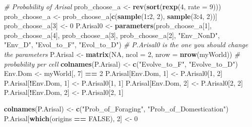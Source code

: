 \documentclass[]{book}
\newenvironment{Shaded}{\begin{snugshade}}{\end{snugshade}}
\newcommand{\KeywordTok}[1]{\textcolor[rgb]{0.13,0.29,0.53}{\textbf{{#1}}}}
\newcommand{\DataTypeTok}[1]{\textcolor[rgb]{0.13,0.29,0.53}{{#1}}}
\newcommand{\DecValTok}[1]{\textcolor[rgb]{0.00,0.00,0.81}{{#1}}}
\newcommand{\StringTok}[1]{\textcolor[rgb]{0.31,0.60,0.02}{{#1}}}
\newcommand{\CommentTok}[1]{\textcolor[rgb]{0.56,0.35,0.01}{\textit{{#1}}}}
\newcommand{\OtherTok}[1]{\textcolor[rgb]{0.56,0.35,0.01}{{#1}}}
\newcommand{\OperatorTok}[1]{\textcolor[rgb]{0.81,0.36,0.00}{\textbf{{#1}}}}
\newcommand{\NormalTok}[1]{{#1}}
\theoremstyle{definition}
\theoremstyle{definition}
\theoremstyle{definition}
\theoremstyle{remark}
\begin{document}
\begin{Shaded}
\begin{Highlighting}[]
    
    \CommentTok{# Probability of Arisal}
\NormalTok{    prob_choose_a <-}\StringTok{ }\KeywordTok{rev}\NormalTok{(}\KeywordTok{sort}\NormalTok{(}\KeywordTok{rexp}\NormalTok{(}\DecValTok{4}\NormalTok{, }\DataTypeTok{rate =} \DecValTok{9}\NormalTok{)))}
\NormalTok{    prob_choose_a <-}\StringTok{ }\NormalTok{prob_choose_a[}\KeywordTok{c}\NormalTok{(}\KeywordTok{sample}\NormalTok{(}\DecValTok{1}\OperatorTok{:}\DecValTok{2}\NormalTok{, }\DecValTok{2}\NormalTok{), }\KeywordTok{sample}\NormalTok{(}\DecValTok{3}\OperatorTok{:}\DecValTok{4}\NormalTok{, }\DecValTok{2}\NormalTok{))]}
\NormalTok{    prob_choose_a[}\DecValTok{3}\NormalTok{] <-}\StringTok{ }\DecValTok{0}
\NormalTok{    P.Arisal0  <-}\StringTok{ }\KeywordTok{parameters}\NormalTok{(prob_choose_a[}\DecValTok{1}\NormalTok{], prob_choose_a[}\DecValTok{4}\NormalTok{],}
\NormalTok{                             prob_choose_a[}\DecValTok{3}\NormalTok{], prob_choose_a[}\DecValTok{2}\NormalTok{],}
                             \StringTok{"Env_NonD"}\NormalTok{, }\StringTok{"Env_D"}\NormalTok{,}
                             \StringTok{"Evol_to_F"}\NormalTok{, }\StringTok{"Evol_to_D"}\NormalTok{)}
    \CommentTok{# P.Arisal0 is the one you should change the parameters}
\NormalTok{    P.Arisal <-}\StringTok{ }\KeywordTok{matrix}\NormalTok{(}\OtherTok{NA}\NormalTok{, }\DataTypeTok{ncol =} \DecValTok{2}\NormalTok{, }\DataTypeTok{nrow =} \KeywordTok{nrow}\NormalTok{(myWorld)) }\CommentTok{# probability per cell}
    \KeywordTok{colnames}\NormalTok{(P.Arisal) <-}\StringTok{ }\KeywordTok{c}\NormalTok{(}\StringTok{"Evolve_to_F"}\NormalTok{, }\StringTok{"Evolve_to_D"}\NormalTok{)}
\NormalTok{    Env.Dom <-}\StringTok{ }\NormalTok{myWorld[, }\DecValTok{7}\NormalTok{] }\OperatorTok{==}\StringTok{ }\DecValTok{2}
\NormalTok{    P.Arisal[Env.Dom, }\DecValTok{1}\NormalTok{] <-}\StringTok{ }\NormalTok{P.Arisal0[}\DecValTok{1}\NormalTok{, }\DecValTok{2}\NormalTok{]}
\NormalTok{    P.Arisal[}\OperatorTok{!}\NormalTok{Env.Dom, }\DecValTok{1}\NormalTok{] <-}\StringTok{ }\NormalTok{P.Arisal0[}\DecValTok{1}\NormalTok{, }\DecValTok{1}\NormalTok{]}
\NormalTok{    P.Arisal[Env.Dom, }\DecValTok{2}\NormalTok{] <-}\StringTok{ }\NormalTok{P.Arisal0[}\DecValTok{2}\NormalTok{, }\DecValTok{2}\NormalTok{]}
\NormalTok{    P.Arisal[}\OperatorTok{!}\NormalTok{Env.Dom, }\DecValTok{2}\NormalTok{] <-}\StringTok{ }\NormalTok{P.Arisal0[}\DecValTok{2}\NormalTok{, }\DecValTok{1}\NormalTok{]}
    
    \KeywordTok{colnames}\NormalTok{(P.Arisal) <-}\StringTok{ }\KeywordTok{c}\NormalTok{(}\StringTok{"Prob_of_Foraging"}\NormalTok{, }\StringTok{"Prob_of_Domestication"}\NormalTok{)}
\NormalTok{    P.Arisal[}\KeywordTok{which}\NormalTok{(origins }\OperatorTok{==}\StringTok{ }\OtherTok{FALSE}\NormalTok{), }\DecValTok{2}\NormalTok{]  <-}\StringTok{ }\DecValTok{0}
    

\end{Highlighting}
\end{Shaded}
\end{document}
